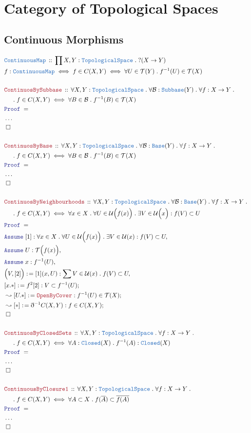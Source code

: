\documentclass[12pt]{scrartcl}
\newcommand{\TYPE}[1]{\textcolor{NavyBlue}{\mathtt{#1}}}
\newcommand{\LOGIC}[1]{\textcolor{Blue}{\mathtt{#1}}}
\newcommand{\THM}[1]{\textcolor{Maroon}{\mathtt{#1}}}
\renewcommand{\.}{\; . \;}
\newcommand{\de}{: \kern 0.1pc =}
\newcommand{\Theorem}[2]{& \THM{#1} \, :: \, #2 \\ & \Proof = \\ }
\newcommand{\DeclareType}[2]{& \TYPE{#1} \, :: \, #2 \\}
\newcommand{\DefineNamedType}[4]{& #1 : \TYPE{#2} \iff #3 \iff #4 \\}
\newcommand{\NewLine}{\\ & \kern 1pc}
\newcommand{\Page}[1]{ \begin{align*} #1 \end{align*}   }
\newcommand{ \bd }{ \ByDef }
\newcommand{\NoProof}{ & \ldots \\ \EndProof}
\newcommand{\Say}[3]{& #1 \de #2 : #3, \\}
\newcommand{\Conclude}[3]{& #1 \de #2 : #3; \\}
\newcommand{\DeriveConclude}[3]{& \leadsto #1 \de #2 : #3 ; \\}
\newcommand{\Assume}[2]{& \LOGIC{Assume} \; #1 : #2, \\}
\newcommand{\QED}{\; \square}
\newcommand{\EndProof}{& \QED \\}
\newcommand{\ByDef}{\eth}
\newcommand{\Proof}{\LOGIC{Proof} \; }
\newcommand{\B}{\mathcal{B}}
\newcommand{\TS}{\TYPE{TopologicalSpace}}
\newcommand{\T}{\mathcal{T}}
\newcommand{\U}{\mathcal{U}}
\begin{document}
\section{Category of Topological Spaces}
\subsection{Continuous Morphisms}
\Page{
	\DeclareType{ContinuousMap}
	{
		\prod X,Y : \TS \.
		?( X \to Y)
	}
	\DefineNamedType{f}{ContinuousMap}{f \in C(X,Y)}
	{ \forall U \in \T(Y) \. f^{-1}(U) \in \T(X)  }
	\\
	\Theorem{ContinuosBySubbase}
	{
		\forall X,Y : \TS \.
		\forall \B : \TYPE{Subbase}(Y) \.
		\forall f : X \to Y \.
		\NewLine \. 
		f \in C(X,Y) \iff
		\forall B \in \B \.
		f^{-1}(B) \in \T(X)
	}
	\NoProof
	\\
	\Theorem{ContinuosByBase}
	{
		\forall X,Y : \TS \.
		\forall \B : \TYPE{Base}(Y) \.
		\forall f : X \to Y \.
		\NewLine \. 
		f \in C(X,Y) \iff
		\forall B \in \B \.
		f^{-1}(B) \in \T(X)
	}
	\NoProof
	\\
	\Theorem{ContinuosByNeighbourhoods}
	{
		\forall X,Y : \TS \.
		\forall \B : \TYPE{Base}(Y) \.
		\forall f : X \to Y \.
		\NewLine \. 
		f \in C(X,Y) \iff
		\forall x \in X \.
		\forall U \in \U\Big(f(x)\Big) \.
		\exists V \in \U\Big(x\Big) :
		f(V) \subset U
	}
	\Assume{[1]}
	{
		\forall x \in X \.
		\forall U \in \U\Big(f(x)\Big) \.
		\exists V \in \U( x ) :
		f(V) \subset U
	}
	\Assume{U}{\T\Big( f(x) \Big)}
	\Assume{x}{f^{-1}(U)}
	\Say{\Big(V,[2]\Big)}{[1](x,U) }{ \sum V \in \U(x) \. f(V) \subset U }
	\Conclude{[x.*]}{f^{2}[2]}{V \subset f^{-1}(U)}
	\DeriveConclude{[U.*]}{\THM{OpenByCover}}{ f^{-1}(U) \in \T(X) }
	\DeriveConclude{[*]}{\bd^{-1} C(X,Y)}{f \in C(X,Y)}
	\EndProof
	\\
	\Theorem{ContinuosByClosedSets}
	{
		\forall X,Y : \TS \.
		\forall f : X \to Y \.
		\NewLine \. 
		f \in C(X,Y) \iff
		\forall A : \TYPE{Closed}(X) \.
		f^{-1}(A) : \TYPE{Closed}(X)
	}
	\NoProof
	\\
	\Theorem{ContinuousByClosure1}
	{
		\forall X,Y : \TS \.
		\forall f : X \to Y \.
		\NewLine \.
		f \in C(X,Y) \iff
		\forall A \subset X \. 
		f(\overline{A}) \subset \overline{f(A)}
	}
	\NoProof
}
\end{document}
